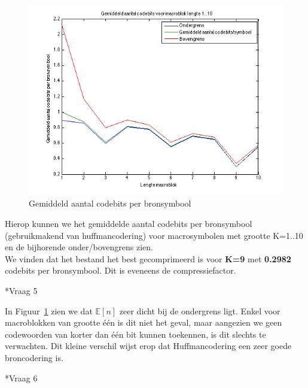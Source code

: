 \documentclass[]{article}
\begin{document}
\begin{section}
\begin{subsection}
        \begin{figure}[h]
            \includegraphics[scale=0.75]{vraag1_4.png}
            \caption{Gemiddeld aantal codebits per bronsymbool}
            \label{fig:codebits}
        \end{figure}

        Hierop kunnen we het gemiddelde aantal codebits per bronsymbool
        (gebruikmakend van huffmancodering) voor macrosymbolen met
        grootte K=1..10 en de bijhorende onder/bovengrens zien. \\

        We vinden dat het bestand het best gecomprimeerd is voor \textbf{K=9} met \textbf{0.2982} codebits per bronsymbool. Dit is eveneens de compressiefactor.
		
    \end{subsection}

    \begin{subsection}*{Vraag 5}

        In Figuur~\ref{fig:codebits} zien we dat $\mathbb{E}[n]$ zeer
        dicht bij de ondergrens ligt. Enkel voor macroblokken van
        grootte \'e\'en is dit niet het geval, maar aangezien we geen
        codewoorden van korter dan \'e\'en bit kunnen toekennen, is dit
        slechts te verwachten. Dit kleine verschil wijst erop dat
        Huffmancodering een zeer goede broncodering is.


    \end{subsection}
    
    \begin{subsection}*{Vraag 6}
    	

\end{subsection}
\end{section}
\end{document}
